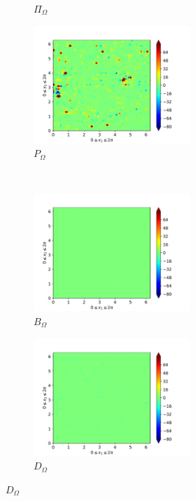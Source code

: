\begin{figure}[H]
\begin{subfigure}{0.45\textwidth}
        \caption{$\Pi_{\Omega}$}
    \end{subfigure}
    \newline
    \begin{subfigure}{0.45\textwidth}
        \includegraphics[height=1.75in]{media/run-cds-65/P-enst-1460}
        \caption{$P_{\Omega}$}
    \end{subfigure}
    ~
    \begin{subfigure}{0.45\textwidth}
        \includegraphics[height=1.75in]{media/run-cds-65/B-enst-1460}
        \caption{$B_{\Omega}$}
    \end{subfigure}
    \newline
    \begin{subfigure}{0.45\textwidth}
        \includegraphics[height=1.75in]{media/run-cds-65/D-enst-1460}
        \caption{$D_{\Omega}$}
    \end{subfigure}
\end{figure}

\newpage

